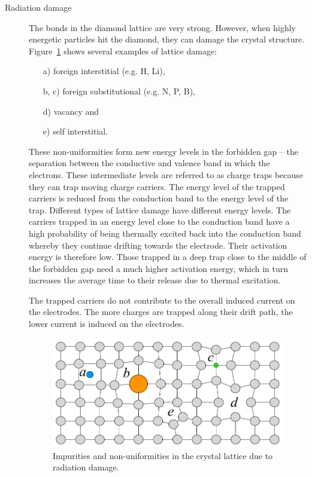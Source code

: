 \begin{description}
\item[Radiation damage]
The bonds in the diamond lattice are very strong. However, when highly energetic particles hit the diamond, they can damage the crystal structure. Figure~\ref{fig:raddamage} shows several examples of lattice damage:
\begin{enumerate}
\item[a)]foreign interstitial (e.g. H, Li),
\item[b, c)]foreign substitutional (e.g. N, P, B),
\item[d)]vacancy and
\item[e)]self interstitial.
\end{enumerate} 
These non-uniformities form new energy levels in the forbidden gap -- the separation between the conductive and valence band in which the electrons. These intermediate levels are referred to as charge traps because they can trap moving charge carriers. The energy level of the trapped carriers is reduced from the conduction band to the energy level of the trap. Different types of lattice damage have different energy levels. The carriers trapped in an energy level close to the conduction band have a high probability of being thermally excited back into the conduction band whereby they continue drifting towards the electrode. Their activation energy is therefore low. Those trapped in a deep trap close to the middle of the forbidden gap need a much higher activation energy, which in turn increases the average time to their release due to thermal excitation.

The trapped carriers do not contribute to the overall induced current on the electrodes. The more charges are trapped along their drift path, the lower current is induced on the electrodes.

\begin{figure}[!t]
\begin{center}
\includegraphics[width=0.8\linewidth]{02_pulse_formation/pics/plots/raddamage}
\caption{Impurities and non-uniformities in the crystal lattice due to radiation damage.}
\label{fig:raddamage}
\end{center}
\end{figure}

\end{description}













